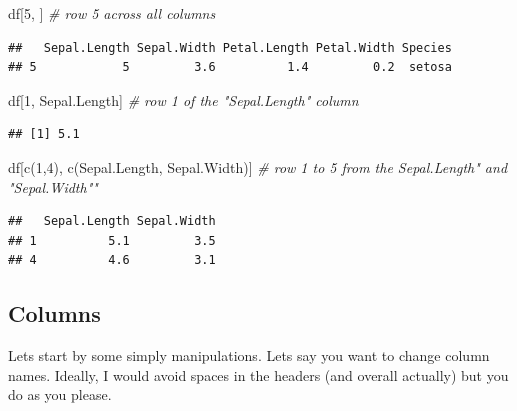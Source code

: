\documentclass[
]{book}
\newenvironment{Shaded}{\begin{snugshade}}{\end{snugshade}}
\newcommand{\CommentTok}[1]{\textcolor[rgb]{0.56,0.35,0.01}{\textit{#1}}}
\newcommand{\DecValTok}[1]{\textcolor[rgb]{0.00,0.00,0.81}{#1}}
\newcommand{\FunctionTok}[1]{\textcolor[rgb]{0.00,0.00,0.00}{#1}}
\newcommand{\NormalTok}[1]{#1}
\newcommand{\StringTok}[1]{\textcolor[rgb]{0.31,0.60,0.02}{#1}}
\begin{document}
\begin{Shaded}
\begin{Highlighting}[]
\NormalTok{df[}\DecValTok{5}\NormalTok{, ]   }\CommentTok{\# row 5 across all columns}
\end{Highlighting}
\end{Shaded}

\begin{verbatim}
##   Sepal.Length Sepal.Width Petal.Length Petal.Width Species
## 5            5         3.6          1.4         0.2  setosa
\end{verbatim}

\begin{Shaded}
\begin{Highlighting}[]
\NormalTok{df[}\DecValTok{1}\NormalTok{, }\StringTok{\textquotesingle{}Sepal.Length\textquotesingle{}}\NormalTok{]  }\CommentTok{\# row 1 of the "Sepal.Length" column}
\end{Highlighting}
\end{Shaded}

\begin{verbatim}
## [1] 5.1
\end{verbatim}

\begin{Shaded}
\begin{Highlighting}[]
\NormalTok{df[}\FunctionTok{c}\NormalTok{(}\DecValTok{1}\NormalTok{,}\DecValTok{4}\NormalTok{), }\FunctionTok{c}\NormalTok{(}\StringTok{\textquotesingle{}Sepal.Length\textquotesingle{}}\NormalTok{, }\StringTok{\textquotesingle{}Sepal.Width\textquotesingle{}}\NormalTok{)]  }\CommentTok{\# row 1 to 5 from the Sepal.Length" and "Sepal.Width""}
\end{Highlighting}
\end{Shaded}

\begin{verbatim}
##   Sepal.Length Sepal.Width
## 1          5.1         3.5
## 4          4.6         3.1
\end{verbatim}

\hypertarget{columns}{%
\subsection{Columns}\label{columns}}

Lets start by some simply manipulations.
Lets say you want to change column names.
Ideally, I would avoid spaces in the headers (and overall actually) but you do as you please.
\end{document}
